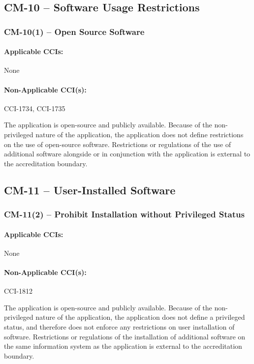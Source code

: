 \documentclass[letterpaper, 10pt, twoside]{article}
\begin{document}
\subsection{CM-10 -- Software Usage Restrictions}

\subsubsection{CM-10(1) -- Open Source Software}

\paragraph{Applicable CCIs:} None

\paragraph{Non-Applicable CCI(s):} CCI-1734, CCI-1735

The application is open-source and publicly available. Because of the non-privileged nature of the application, the application does not define restrictions on the use of open-source software. Restrictions or regulations of the use of additional software alongside or in conjunction with the application is external to the accreditation boundary.

\subsection{CM-11 -- User-Installed Software}

\subsubsection{CM-11(2) -- Prohibit Installation without Privileged Status}

\paragraph{Applicable CCIs:} None

\paragraph{Non-Applicable CCI(s):} CCI-1812

The application is open-source and publicly available. Because of the non-privileged nature of the application, the application does not define a privileged status, and therefore does not enforce any restrictions on user installation of software. Restrictions or regulations of the installation of additional software on the same information system as the application is external to the accreditation boundary.

\clearpage
\printbibliography
\end{document}
